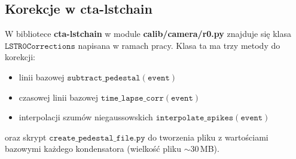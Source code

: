 \documentclass[a4paper,11pt,twoside]{article}
\begin{document}
\subsection{Korekcje w cta-lstchain}
W bibliotece {\bf{cta-lstchain}} w module {\bf{calib/camera/r0.py}} znajduje się klasa $\mathtt{LSTR0Corrections}$ napisana w ramach pracy. Klasa ta ma trzy metody do korekcji:
\begin{itemize}
\item linii bazowej $\mathtt{subtract\_pedestal(event)}$
\item czasowej linii bazowej $\mathtt{time\_lapse\_corr(event)}$
\item interpolacji szumów niegaussowskich $\mathtt{interpolate\_spikes(event)}$
\end{itemize}
oraz skrypt $\mathtt{create\_pedestal\_file.py}$ do tworzenia pliku z wartościami bazowymi każdego kondensatora (wielkość pliku $\sim$30\,MB).
\newpage
\end{document}
